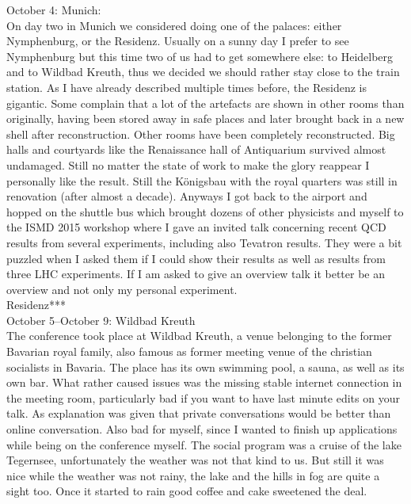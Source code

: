 October 4: Munich:\\
On day two in Munich we considered doing one of the palaces: either Nymphenburg, or the Residenz. Usually on a sunny day I prefer to see Nymphenburg but this time two of us had to get somewhere else: to Heidelberg and to Wildbad Kreuth, thus we decided we should rather stay close to the train station. As I have already described multiple times before, the Residenz is gigantic. Some complain that a lot of the artefacts are shown in other rooms than originally, having been stored away in safe places and later brought back in a new shell after reconstruction. Other rooms have been completely reconstructed. Big halls and courtyards like the Renaissance hall of Antiquarium survived almost undamaged. Still no matter the state of work to make the glory reappear I personally like the result. Still the K\"onigsbau with the royal quarters was still in renovation (after almost a decade). Anyways I got back to the airport and hopped on the shuttle bus which brought dozens of other physicists and myself to the ISMD 2015 workshop where I gave an invited talk concerning recent QCD results from several experiments, including also Tevatron results. They were a bit puzzled when I asked them if I could show their results as well as results from three LHC experiments. If I am asked to give an overview talk it better be an overview and not only my personal experiment.\\

Residenz***\\

October 5--October 9: Wildbad Kreuth\\
The conference took place at Wildbad Kreuth, a venue belonging to the former Bavarian royal family, also famous as former meeting venue of the christian socialists in Bavaria. The place has its own swimming pool, a sauna, as well as its own bar. What rather caused issues was the missing stable internet connection in the meeting room, particularly bad if you want to have last minute edits on your talk. As explanation was given that private conversations would be better than online conversation. Also bad for myself, since I wanted to finish up applications while being on the conference myself. The social program was a cruise of the lake Tegernsee, unfortunately the weather was not that kind to us. But still it was nice while the weather was not rainy, the lake and the hills in fog are quite a sight too. Once it started to rain good coffee and cake sweetened the deal.\\

